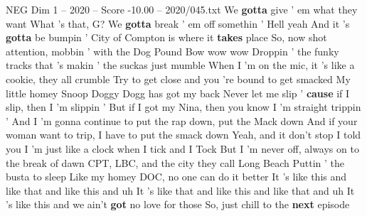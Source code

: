 \begin{textsample}{NEG Dim 1 – 2020 – Score -10.00 – 2020/045.txt}
We \textbf{gotta} give ' em what they want What 's that, G?
We \textbf{gotta} break ' em off somethin ' Hell yeah And it 's \textbf{gotta} be bumpin ' City of Compton is where it \textbf{takes} place So, now shot attention, mobbin ' with the Dog Pound Bow wow wow Droppin ' the funky tracks that 's makin ' the suckas just mumble When I 'm on the mic, it 's like a cookie, they all crumble Try to get close and you 're bound to get smacked My little homey Snoop Doggy Dogg has got my back Never let me slip ' \textbf{cause} if I slip, then I 'm slippin ' But if I got my Nina, then you know I 'm straight trippin ' And I 'm gonna continue to put the rap down, put the Mack down And if your woman want to trip, I have to put the smack down Yeah, and it don't stop I told you I 'm just like a clock when I tick and I Tock But I 'm never off, always on to the break of dawn CPT, LBC, and the city they call Long Beach Puttin ' the busta to sleep Like my homey DOC, no one can do it better It 's like this and like that and like this and uh It 's like that and like this and like that and uh It 's like this and we ain't \textbf{got} no love for those So, just chill to the \textbf{next} episode

\end{textsample}
